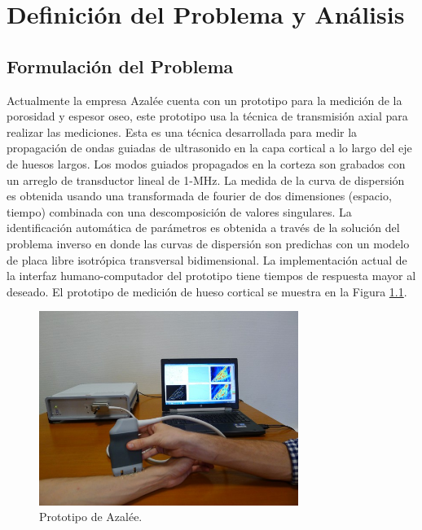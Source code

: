 
\chapter{Definición del Problema y Análisis}

\section{Formulación del Problema}

Actualmente la empresa Azalée cuenta con un prototipo para la medición de la porosidad y espesor oseo, este prototipo usa la técnica de transmisión axial para realizar las mediciones.
Esta es una técnica desarrollada para medir la propagación de ondas guiadas de ultrasonido en la capa cortical a lo largo del eje de huesos largos.
Los modos guiados propagados en la corteza son grabados con un arreglo de
transductor lineal de 1-MHz.
La medida de la curva de dispersión es obtenida usando una transformada de
fourier de dos dimensiones (espacio, tiempo) combinada con una descomposición
de valores singulares.
La identificación automática de parámetros es obtenida a través de la solución del problema inverso en donde las curvas de dispersión son predichas con un modelo de placa libre isotrópica transversal bidimensional.
La implementación actual de la interfaz humano-computador del prototipo tiene
tiempos de respuesta mayor al deseado.
El prototipo de medición de hueso cortical se muestra en la Figura \ref{fig:hmem}.

\begin{figure}[H]
    \centering
    \includegraphics[width=0.75\textwidth]{imagenes/image9.jpg}
    \caption{Prototipo de Azalée.}
    \label{fig:hmem}
\end{figure}




